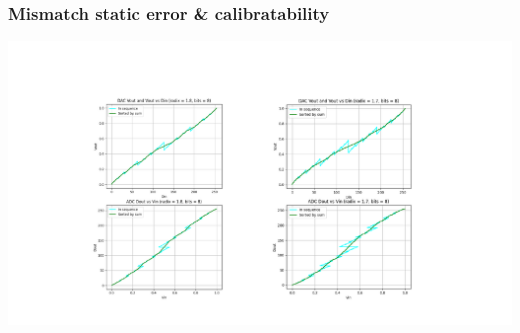 \documentclass[aspectratio=169]{beamer}
\begin{document}
\begin{frame}
  \frametitle{Mismatch static error \& calibratability}
    \begin{center}
    \includegraphics[width=\textwidth]{overlap.pdf}
    \end{center}
  \end{frame}
\end{document}
